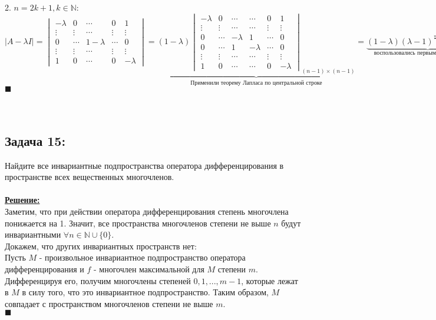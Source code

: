 \documentclass[a4paper,12pt,titlepage,final]{article}
\begin{document}
2. $n = 2k + 1, k \in \mathbb{N}$: \\
$|A - \lambda I| = 
\begin{vmatrix}
    -\lambda & 0 & \cdots & 0 & 1 \\
    \vdots & \vdots & \cdots & \vdots & \vdots \\ 
    0 & \cdots & 1 -\lambda & \cdots & 0 \\
    \vdots & \vdots & \cdots & \vdots & \vdots \\ 
    1 & 0 & \cdots & 0 & -\lambda
\end{vmatrix} =
\underbrace{(1 - \lambda)
\begin{vmatrix}
    -\lambda & 0 & \cdots & \cdots & 0 & 1 \\
    \vdots & \vdots & \cdots & \cdots & \vdots & \vdots \\ 
    0 & \cdots & -\lambda & 1 & \cdots & 0 \\
    0 & \cdots & 1 & -\lambda & \cdots & 0 \\
    \vdots & \vdots & \cdots & \cdots & \vdots & \vdots \\ 
    1 & 0 & \cdots & \cdots & 0 & -\lambda
\end{vmatrix}_{(n - 1) \times (n - 1)}}_{\text{Применили теорему Лапласа по центральной строке}} = 
\underbrace{(1 - \lambda)(\lambda - 1)^{\frac{n - 1}{2}}(\lambda + 1)^{\frac{n - 1}{2}}}_{\text{воспользовались первым пунктом решения}} = 
-(\lambda - 1)^{\frac{n + 1}{2}}(\lambda + 1)^{\frac{n - 1}{2}}$ \\ $\blacksquare$ \\ \\ \\


\subsection*{Задача 15:}
\noindent Найдите все инвариантные подпространства оператора дифференцирования в пространстве
всех вещественных многочленов. \\ \\
\textbf{\underline{Решение:}} \\
Заметим, что при действии оператора дифференцирования степень многочлена понижается на 1. Значит, все пространства 
многочленов степени не выше $n$ будут инвариантными $\forall n \in \mathbb{N} \cup \{0\}$. \\
Докажем, что других инвариантных пространств нет:\\
Пусть $M$ - произвольное инвариантное подпространство оператора дифференцирования и $f$ - многочлен максимальной 
для $M$ степени $m$. Дифференцируя его, получим многочлены степеней $0, 1, ... , m - 1$, которые 
лежат в $M$ в силу того, что это инвариантное подпространство. Таким образом, $M$ совпадает с пространством многочленов 
степени не выше $m$. \\ $\blacksquare$ \\ \\ \\
\end{document}
